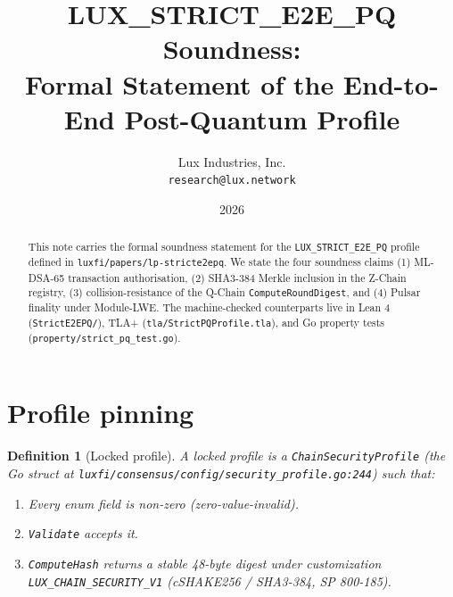 \documentclass[11pt,a4paper]{article}
\title{LUX\_STRICT\_E2E\_PQ Soundness:\\
Formal Statement of the End-to-End Post-Quantum Profile}
\author{Lux Industries, Inc.\\\texttt{research@lux.network}}
\date{2026}
\newtheorem{definition}{Definition}
\begin{document}
\maketitle

\begin{abstract}
This note carries the formal soundness statement for the
\texttt{LUX\_STRICT\_E2E\_PQ} profile defined in
\texttt{luxfi/papers/lp-stricte2epq}. We state the four soundness claims (1)
ML-DSA-65 transaction authorisation, (2) SHA3-384 Merkle inclusion in the
Z-Chain registry, (3) collision-resistance of the Q-Chain
\texttt{ComputeRoundDigest}, and (4) Pulsar finality under Module-LWE. The
machine-checked counterparts live in Lean 4 (\texttt{StrictE2EPQ/}), TLA+
(\texttt{tla/StrictPQProfile.tla}), and Go property tests
(\texttt{property/strict\_pq\_test.go}).
\end{abstract}

\section{Profile pinning}

\begin{definition}[Locked profile]
\label{def:locked}
A \emph{locked profile} is a \texttt{ChainSecurityProfile} (the Go struct
at \texttt{luxfi/consensus/config/security\_profile.go:244}) such that:
\begin{enumerate}[leftmargin=2em,nosep]
  \item Every enum field is non-zero (zero-value-invalid).
  \item \texttt{Validate} accepts it.
  \item \texttt{ComputeHash} returns a stable 48-byte digest under
    customization \texttt{LUX\_CHAIN\_SECURITY\_V1} (cSHAKE256 / SHA3-384,
    SP 800-185).
\end{enumerate}
\end{definition}
\end{document}
